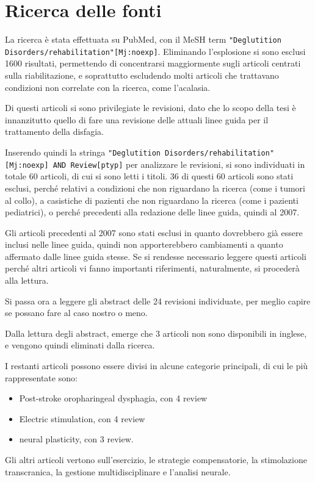 \chapter{Ricerca delle fonti}
La ricerca è stata effettuata su PubMed, con il MeSH term \texttt{"Deglutition 
Disorders/rehabilitation"[Mj:noexp]}.
Eliminando l'esplosione si sono esclusi 1600 risultati, permettendo di 
concentrarsi maggiormente sugli articoli centrati sulla riabilitazione, e 
soprattutto escludendo molti articoli che trattavano condizioni non correlate 
con la ricerca, come l'acalasia.

Di questi articoli si sono privilegiate le revisioni, dato che lo scopo della 
tesi è innanzitutto quello di fare una revisione delle attuali linee guida per 
il trattamento della disfagia.

Inserendo quindi la stringa \texttt{"Deglutition Disorders/rehabilitation"}\\
\texttt{[Mj:noexp] AND Review[ptyp]} per analizzare le revisioni, si sono 
individuati 
in totale 60 articoli, di cui si sono letti i titoli.
36 di questi 60 articoli sono stati esclusi, perché relativi a condizioni che 
non riguardano la ricerca (come i tumori al collo), a casistiche di pazienti 
che non riguardano la ricerca (come i pazienti pediatrici), o perché precedenti 
alla redazione delle linee guida, quindi al 2007.

Gli articoli precedenti al 2007 sono stati esclusi in quanto dovrebbero già 
essere inclusi nelle linee guida, quindi non apporterebbero cambiamenti a 
quanto affermato dalle linee guida stesse.
Se si rendesse necessario leggere questi articoli perché altri articoli vi 
fanno importanti riferimenti, naturalmente, si procederà alla lettura.

Si passa ora a leggere gli abstract delle 24 revisioni individuate, per meglio 
capire se possano fare al caso nostro o meno.

Dalla lettura degli abstract, emerge che 3 articoli non sono disponibili in 
inglese, e vengono quindi eliminati dalla ricerca.

I restanti articoli possono essere divisi in alcune categorie principali, di 
cui le più rappresentate sono:
\begin{itemize}
	\item Post-stroke oropharingeal dysphagia, con 4 review
	\item Electric stimulation, con 4 review
	\item neural plasticity, con 3 review.
\end{itemize}
Gli altri articoli vertono sull'esercizio, le strategie compensatorie, la 
stimolazione transcranica, la gestione multidisciplinare e l'analisi neurale.

